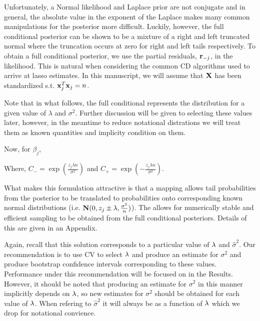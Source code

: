 Unfortunately, a Normal likelihood and Laplace prior are not conjugate and in general, the absolute value in the exponent of the Laplace makes many common manipulations for the posterior more difficult. Luckily, however, the full conditional posterior can be shown to be a mixture of a right and left truncated normal where the truncation occurs at zero for right and left tails respectively. To obtain a full conditional posterior, we use the partial residuals, $\mathbf{r}_{-j}$, in the likelihood. This is natural when considering the common CD algorithms used to arrive at lasso estimates. In this manuscript, we will assume that $\mathbf{X}$ has been standardized s.t. $\mathbf{x}_j^T\mathbf{x}_j = n$.

Note that in what follows, the full conditional represents the distribution for a given value of $\lambda$ and $\sigma^2$. Further discussion will be given to selecting these values later, however, in the meantime to reduce notational distrations we will treat them as known quantities and implicity condition on them.

Now, for $\beta_j$,


Where, $C_{-} = \exp(\frac{z_j \lambda n}{\sigma^2})$ and $C_{+} = \exp(-\frac{z_j \lambda n}{\sigma^2})$.

What makes this formulation attractive is that a mapping allows tail probabilities from the posterior to be translated to probabilities onto corresponding known normal distributions (i.e. $\mathbf{N}(0, z_j \pm \lambda, \frac{\sigma^2}{n})$). The allows for numerically stable and efficient sampling to be obtained from the full conditional posteriors. Details of this are given in an Appendix.

Again, recall that this solution corresponds to a particular value of $\lambda$ and $\hat{\sigma}^2$. Our recommendation is to use CV to select $\lambda$ and produce an estimate for $\sigma^2$ and produce bootstrap confidence intervals corresponding to these values. Performance under this recommendation will be focused on in the Results. However, it should be noted that producing an estimate for $\sigma^2$ in this manner implicitly depends on $\lambda$, so new estimates for $\sigma^2$ should be obtained for each value of $\lambda$. When refering to $\hat{\sigma}^2$ it will always be as a function of $\lambda$ which we drop for notational convience.

